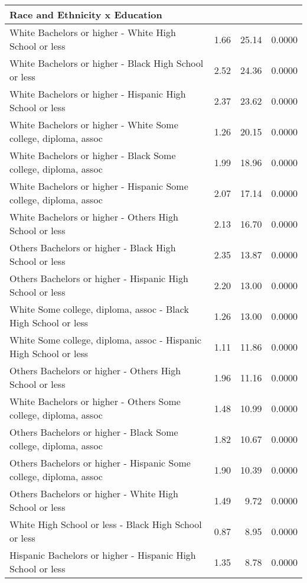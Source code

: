\begin{center}
\begin{longtable}{lrrr}
    \label{tab:PostHoc} \\
{\bf{Race and Ethnicity x Education}} & & & \\
\hline
    White Bachelors or higher -  White High School or less & 1.66 & 25.14 & 0.0000 \\ 
    White Bachelors or higher -  Black High School or less & 2.52 & 24.36 & 0.0000 \\ 
    White Bachelors or higher -  Hispanic High School or less & 2.37 & 23.62 & 0.0000 \\ 
    White Bachelors or higher -  White Some college, diploma, assoc & 1.26 & 20.15 & 0.0000 \\ 
    White Bachelors or higher -  Black Some college, diploma, assoc & 1.99 & 18.96 & 0.0000 \\ 
    White Bachelors or higher -  Hispanic Some college, diploma, assoc & 2.07 & 17.14 & 0.0000 \\ 
    White Bachelors or higher -  Others High School or less & 2.13 & 16.70 & 0.0000 \\ 
    Others Bachelors or higher -  Black High School or less & 2.35 & 13.87 & 0.0000 \\ 
    Others Bachelors or higher -  Hispanic High School or less & 2.20 & 13.00 & 0.0000 \\ 
    White Some college, diploma, assoc -  Black High School or less & 1.26 & 13.00 & 0.0000 \\ 
    White Some college, diploma, assoc -  Hispanic High School or less & 1.11 & 11.86 & 0.0000 \\ 
    Others Bachelors or higher -  Others High School or less & 1.96 & 11.16 & 0.0000 \\ 
    White Bachelors or higher -  Others Some college, diploma, assoc & 1.48 & 10.99 & 0.0000 \\ 
    Others Bachelors or higher -  Black Some college, diploma, assoc & 1.82 & 10.67 & 0.0000 \\ 
    Others Bachelors or higher -  Hispanic Some college, diploma, assoc & 1.90 & 10.39 & 0.0000 \\ 
    Others Bachelors or higher -  White High School or less & 1.49 & 9.72 & 0.0000 \\ 
    White High School or less -  Black High School or less & 0.87 & 8.95 & 0.0000 \\ 
    Hispanic Bachelors or higher -  Hispanic High School or less & 1.35 & 8.78 & 0.0000 \\ 

\end{longtable}
\end{center}
